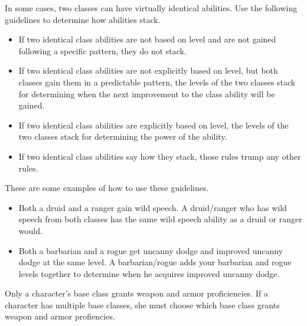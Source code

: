         \par In some cases, two classes can have virtually identical abilities.
        Use the following guidelines to determine how abilities stack.
        \begin{itemize}
            \item If two identical class abilities are not based on level and are not gained following a specific pattern, they do not stack.
            \item If two identical class abilities are not explicitly based on level, but both classes gain them in a predictable pattern, the levels of the two classes stack for determining when the next improvement to the class ability will be gained.
            \item If two identical class abilities are explicitly based on level, the levels of the two classes stack for determining the power of the ability.
            \item If two identical class abilities say how they stack, those rules trump any other rules.
        \end{itemize}
        These are some examples of how to use these guidelines.
        \begin{itemize}
            \item Both a druid and a ranger gain wild speech.
                A druid/ranger who has wild speech from both classes has the same wild speech ability as a druid or ranger would.
            \item Both a barbarian and a rogue get uncanny dodge and improved uncanny dodge at the same level.
                A barbarian/rogue adds your barbarian and rogue levels together to determine when he acquires improved uncanny dodge.
        \end{itemize}

        Only a character's base class grants weapon and armor proficiencies.
        If a character has multiple base classes, she must choose which base class grants weapon and armor profiencies.
